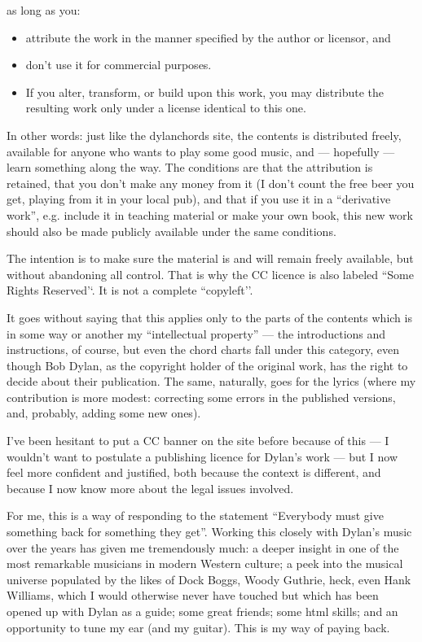 \begin{articlelayout}
as long as you:
\begin{itemize}
  \item attribute the work in the manner specified by the author or
    licensor, and
  \item don't use it for commercial purposes.
  \item If you alter, transform, or build upon this work, you may
    distribute the resulting work only under a license identical to
    this one.
\end{itemize}
 
In other words: just like the dylanchords site, the contents is
distributed freely, available for anyone who wants to play some good
music, and --- hopefully --- learn something along the way. The
conditions are that the attribution is retained, that you don't make
any money from it (I don't count the free beer you get, playing from
it in your local pub), and that if you use it in a ``derivative
work'', e.g. include it in teaching material or make your own book,
this new work should also be made publicly available under the same
conditions.
 
The intention is to make sure the material is and will remain freely
available, but without abandoning all control. That is why the CC
licence is also labeled ``Some Rights Reserved'`{}. It is not a
complete ``copyleft'{}'.
 
It goes without saying that this applies only to the parts of the
contents which is in some way or another my ``intellectual property''
--- the introductions and instructions, of course, but even the chord
charts fall under this category, even though Bob Dylan, as the
copyright holder of the original work, has the right to decide about
their publication. The same, naturally, goes for the lyrics (where my
contribution is more modest: correcting some errors in the published
versions, and, probably, adding some new ones).
 
I've been hesitant to put a CC banner on the site before because of
this --- I wouldn't want to postulate a publishing licence for
Dylan's work --- but I now feel more confident and justified, both
because the context is different, and because I now know more about
the legal issues involved.
 
For me, this is a way of responding to the statement ``Everybody must
give something back for something they get''. Working this closely
with Dylan's music over the years has given me tremendously much: a
deeper insight in one of the most remarkable musicians in modern
Western culture; a peek into the musical universe populated by the
likes of Dock Boggs, Woody Guthrie, heck, even Hank Williams, which I
would otherwise never have touched but which has been opened up with
Dylan as a guide; some great friends; some html skills; and an
opportunity to tune my ear (and my guitar). This is my way of paying
back.
\end{articlelayout}
